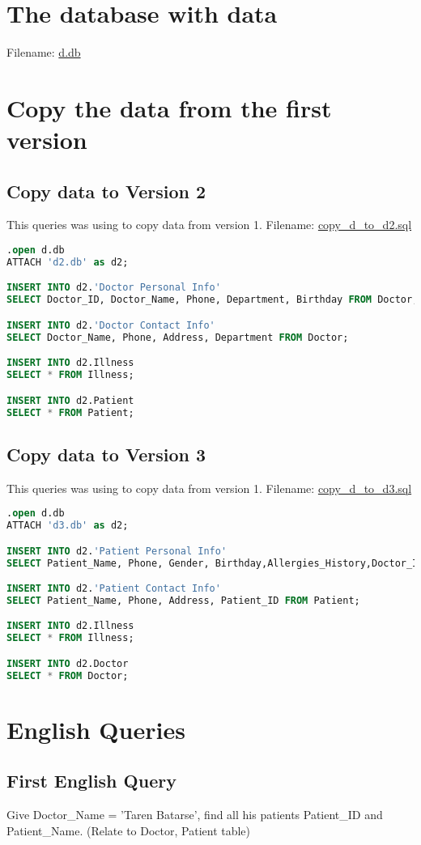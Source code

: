 \documentclass[12pt,arial]{article}
\begin{document}
\section{The database with data}
Filename: \url{d.db}


\section{Copy the data from the first version}
\subsection{Copy data to Version 2}
This queries was using to copy data from version 1.
Filename: \url{copy_d_to_d2.sql}
\begin{lstlisting}[language=SQL]
.open d.db
ATTACH 'd2.db' as d2;

INSERT INTO d2.'Doctor Personal Info'
SELECT Doctor_ID, Doctor_Name, Phone, Department, Birthday FROM Doctor;

INSERT INTO d2.'Doctor Contact Info'
SELECT Doctor_Name, Phone, Address, Department FROM Doctor;

INSERT INTO d2.Illness
SELECT * FROM Illness;

INSERT INTO d2.Patient
SELECT * FROM Patient;
\end{lstlisting}
\subsection{Copy data to Version 3}
This queries was using to copy data from version 1.
Filename: \url{copy_d_to_d3.sql}
\begin{lstlisting}[language=SQL]
.open d.db
ATTACH 'd3.db' as d2;

INSERT INTO d2.'Patient Personal Info'
SELECT Patient_Name, Phone, Gender, Birthday,Allergies_History,Doctor_ID,Illness_ID FROM Patient;

INSERT INTO d2.'Patient Contact Info'
SELECT Patient_Name, Phone, Address, Patient_ID FROM Patient;

INSERT INTO d2.Illness
SELECT * FROM Illness;

INSERT INTO d2.Doctor
SELECT * FROM Doctor;
\end{lstlisting}

\section{English Queries}
\subsection{First English Query}
Give Doctor\_Name = 'Taren Batarse', find all his patients Patient\_ID and Patient\_Name.
(Relate to Doctor, Patient table)
\end{document}
